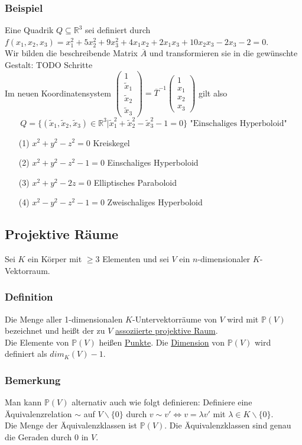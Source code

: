 \documentclass[a4paper]{article}
\newcommand{\ul}{\underline}
\begin{document}
\subsubsection{Beispiel}
Eine Quadrik \(Q\subseteq\mathbb{R}^3\) sei definiert durch \(f(x_1,x_2,x_3)=x_1^2+5x_2^2+9x_3^2+4x_1x_2+2x_1x_3+10x_2x_3-2x_3-2=0\).\\
Wir bilden die beschreibende Matrix \(\overline{A}\) und transformieren sie in die gewünschte Gestalt: TODO Schritte\\
Im neuen Koordinatensystem \(\begin{pmatrix}
1\\
\tilde{x}_1\\
\tilde{x}_2\\
\tilde{x}_3
\end{pmatrix}=\overline{T}^{-1}\begin{pmatrix}
1\\
x_1\\
x_2\\
x_3
\end{pmatrix}\) gilt also
$$Q=\{(\tilde{x}_1,\tilde{x}_2,\tilde{x}_3)\in\mathbb{R}^3|\tilde{x}_1^2+\tilde{x}_2^2-\tilde{x}_3^2-1=0\}\text{ "Einschaliges Hyperboloid"}$$
\begin{itemize}
\item[(1)] \(x^2+y^2-z^2=0\) Kreiskegel
\item[(2)] \(x^2+y^2-z^2-1=0\) Einschaliges Hyperboloid
\item[(3)] \(x^2+y^2-2z=0\) Elliptisches Paraboloid
\item[(4)] \(x^2-y^2-z^2-1=0\) Zweischaliges Hyperboloid
\end{itemize}
\subsection{Projektive Räume}
Sei \(K\) ein Körper mit \(\geq 3\) Elementen und sei \(V\) ein \(n\)-dimensionaler \(K\)-Vektorraum.
\subsubsection{Definition}
Die Menge aller 1-dimensionalen \(K\)-Untervektorräume von \(V\) wird mit \(\mathbb{P}(V)\) bezeichnet und heißt der zu \(V\) \ul{assoziierte projektive Raum}.\\
Die Elemente von \(\mathbb{P}(V)\) heißen \ul{Punkte}. Die \ul{Dimension} von \(\mathbb{P}(V)\) wird definiert als \(dim_K(V)-1\).
\subsubsection{Bemerkung}
Man kann \(\mathbb{P}(V)\) alternativ auch wie folgt definieren: Definiere eine Äquivalenzrelation \(\sim\) auf \(V\backslash\{0\}\) durch \(v\sim v'\Leftrightarrow v=\lambda v'\) mit \(\lambda\in K\backslash\{0\}\).\\
Die Menge der Äquivalenzklassen ist \(\mathbb{P}(V)\). Die Äquivalenzklassen sind genau die Geraden durch 0 in \(V\).
\end{document}
